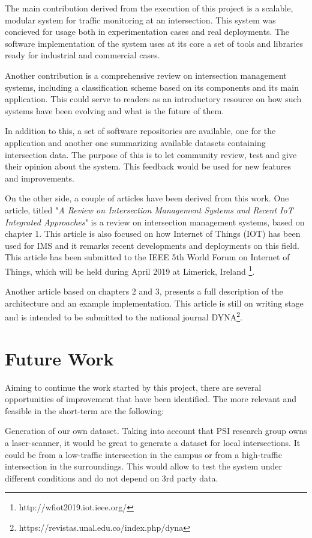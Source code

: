 The main contribution derived from the execution of this project is a scalable, modular system for traffic monitoring at an intersection. This system was concieved for usage both in experimentation cases and real deployments. The software implementation of the system uses at its core a set of tools and libraries ready for industrial and commercial cases.

Another contribution is a comprehensive review on intersection management systems, including a classification scheme based on its components and its main application. This could serve to readers as an introductory resource on how such systems have been evolving and what is the future of them.

In addition to this, a set of software repositories are available, one for the application and another one summarizing available datasets containing intersection data. The purpose of this is to let community review, test and give their opinion about the system. This feedback would be used for new features and improvements. 


On the other side, a couple of articles have been derived from this work. One article, titled "\textit{A Review on Intersection Management Systems and Recent IoT Integrated Approaches}" is a review on intersection management systems, based on chapter 1. This article is also focused on how Internet of Things (IOT) has been used for IMS and it remarks recent developments and deployments on this field. This article has been submitted to the IEEE 5th World Forum on Internet of Things, which will be held during April 2019 at Limerick, Ireland \footnote{http://wfiot2019.iot.ieee.org/}.

 Another article based on chapters 2 and 3, presents a full description of the architecture and an example implementation. This article is still on writing stage and is intended to be submitted to the national journal DYNA\footnote{https://revistas.unal.edu.co/index.php/dyna}. 

\section{Future Work}

Aiming to continue the work started by this project, there are several opportunities of improvement that have been identified. The more relevant and feasible in the short-term are the following:

Generation of our own dataset. Taking into account that PSI research group owns a laser-scanner, it would be great to generate a dataset for local intersections. It could be from a low-traffic intersection in the campus or from a high-traffic intersection in the surroundings. This would allow to test the system under different conditions and do not depend on 3rd party data.

